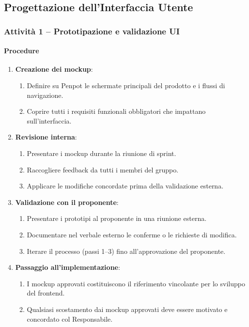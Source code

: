 \documentclass[a4paper, 11pt, oneside]{scrartcl}
\begin{document}
\subsection{Progettazione dell'Interfaccia Utente}

\subsubsection{Attività 1 – Prototipazione e validazione UI}

\paragraph{Procedure}
\begin{enumerate}
    \item \textbf{Creazione dei mockup}:
          \begin{enumerate}[label=\alph*.]
              \item Definire su Penpot{\scriptsize{}} le schermate principali del prodotto e i flussi di navigazione.
              \item Coprire tutti i requisiti funzionali obbligatori che impattano sull'interfaccia.
          \end{enumerate}
    \item \textbf{Revisione interna}:
          \begin{enumerate}[label=\alph*.]
              \item Presentare i mockup durante la riunione di sprint.
              \item Raccogliere feedback da tutti i membri del gruppo.
              \item Applicare le modifiche concordate prima della validazione esterna.
          \end{enumerate}
    \item \textbf{Validazione con il proponente}:
          \begin{enumerate}[label=\alph*.]
              \item Presentare i prototipi al proponente in una riunione esterna.
              \item Documentare nel verbale esterno le conferme o le richieste di modifica.
              \item Iterare il processo (passi 1–3) fino all'approvazione del proponente.
          \end{enumerate}
    \item \textbf{Passaggio all'implementazione}:
          \begin{enumerate}[label=\alph*.]
              \item I mockup approvati costituiscono il riferimento vincolante per lo sviluppo del frontend.
              \item Qualsiasi scostamento dai mockup approvati deve essere motivato e concordato col Responsabile.
          \end{enumerate}
\end{enumerate}
\end{document}
